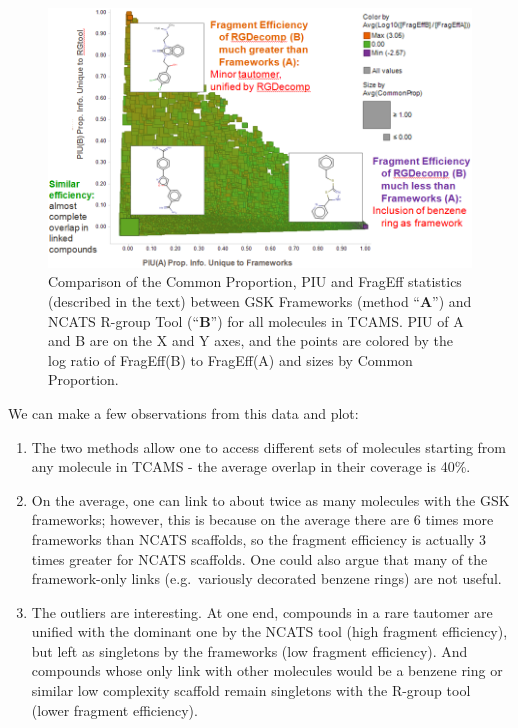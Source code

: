 \documentclass[journal=jacsat,manuscript=article]{achemso}
\newcommand*\eg{e.g.~}
\begin{document}
\begin{figure}
\includegraphics[width=6in]{fig/statcompare_frames_RGtool.png}
\caption{Comparison of the Common Proportion, PIU and FragEff statistics (described in the text) between GSK Frameworks (method ``{\bf A}'') and NCATS R-group Tool (``{\bf B}'') for all molecules in TCAMS. PIU of A and B are on the X and Y axes, and the points are colored by the log ratio of FragEff(B) to FragEff(A) and sizes by Common Proportion.}
\label{fig:statcompare}
\end{figure}
 
We can make a few observations from this data and plot:
\begin{enumerate} 
\item The two methods allow one to access different sets of molecules starting from any molecule in TCAMS - the average overlap in their coverage is 40\%.
\item On the average, one can link to about twice as many molecules with the GSK frameworks; however, this is because on the average there are 6 times more frameworks than NCATS scaffolds, so the fragment efficiency is actually 3 times greater for NCATS scaffolds. One could also argue that many of the framework-only links (\eg variously decorated benzene rings) are not useful.
\item The outliers are interesting. At one end, compounds in a rare tautomer are unified with the dominant one by the NCATS tool (high fragment efficiency), but left as singletons by the frameworks (low fragment efficiency). And compounds whose only link with other molecules would be a benzene ring or similar low complexity scaffold remain singletons with the R-group tool (lower fragment efficiency).
\end{enumerate}
\end{document}
